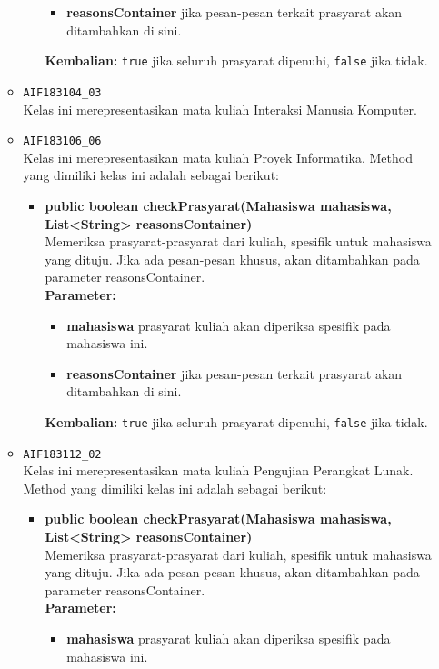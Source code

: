 \begin{enumerate}
\begin{itemize}
\begin{itemize}
\begin{itemize}
				\item \textbf{reasonsContainer} jika pesan-pesan terkait prasyarat akan ditambahkan di sini.
			\end{itemize}
			\textbf{Kembalian:} \texttt{true} jika seluruh prasyarat dipenuhi, \texttt{false} jika tidak.
		\end{itemize}
		\item \texttt{AIF183104\_03} \\
		Kelas ini merepresentasikan mata kuliah Interaksi Manusia Komputer.
		\item \texttt{AIF183106\_06} \\
		Kelas ini merepresentasikan mata kuliah Proyek Informatika. Method yang dimiliki kelas ini adalah sebagai berikut: 
		\begin{itemize}
			\item \textbf{public boolean checkPrasyarat(Mahasiswa mahasiswa, List<String> reasonsContainer)}\\
			Memeriksa prasyarat-prasyarat dari kuliah, spesifik untuk mahasiswa yang dituju. Jika ada pesan-pesan khusus, akan ditambahkan pada parameter reasonsContainer.\\
			\textbf{Parameter:}
			\begin{itemize}
				\item \textbf{mahasiswa} prasyarat kuliah akan diperiksa spesifik pada mahasiswa ini.
				\item \textbf{reasonsContainer} jika pesan-pesan terkait prasyarat akan ditambahkan di sini.
			\end{itemize}
			\textbf{Kembalian:} \texttt{true} jika seluruh prasyarat dipenuhi, \texttt{false} jika tidak.
		\end{itemize}
		\item \texttt{AIF183112\_02} \\
		Kelas ini merepresentasikan mata kuliah Pengujian Perangkat Lunak. Method yang dimiliki kelas ini adalah sebagai berikut: 
		\begin{itemize}
			\item \textbf{public boolean checkPrasyarat(Mahasiswa mahasiswa, List<String> reasonsContainer)}\\
			Memeriksa prasyarat-prasyarat dari kuliah, spesifik untuk mahasiswa yang dituju. Jika ada pesan-pesan khusus, akan ditambahkan pada parameter reasonsContainer.\\
			\textbf{Parameter:}
			\begin{itemize}
				\item \textbf{mahasiswa} prasyarat kuliah akan diperiksa spesifik pada mahasiswa ini.

\end{itemize}
\end{itemize}
\end{itemize}
\end{enumerate}
